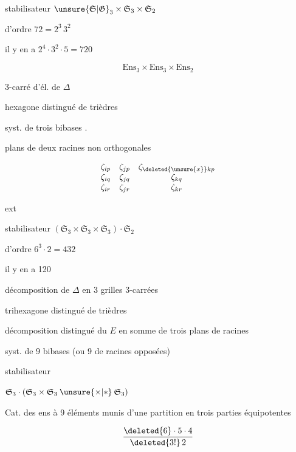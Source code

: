 stabilisateur $\unsure{\mathfrak S|\mathfrak G}_3\times\mathfrak S_3\times\mathfrak S_2$

d'ordre $72=2^3\,3^2$

il y en a $2^4\cdot3^2\cdot5=720$

\[
 \mathrm{Ens}_3\times\mathrm{Ens}_3\times\mathrm{Ens}_2
\]

 3-carré d'él. de $\Delta$

hexagone distingué de trièdres

syst. de trois bibases  .

plans de deux racines non orthogonales

\[
 \begin{matrix}
 \zeta_{ip}&\zeta_{jp}&\zeta_{\deleted{\unsure{x}}kp}\\
 \zeta_{iq}&\zeta_{jq}&\zeta_{kq}\\
 \zeta_{ir}&\zeta_{jr}&\zeta_{kr}
 \end{matrix}
\]

ext

stabilisateur $(\mathfrak S_3\times\mathfrak S_3\times\mathfrak S_3)\cdot\mathfrak S_2$

d'ordre $6^3\cdot2=432$

il y en a 120

décomposition de $\Delta$ en 3 grilles 3-carrées

trihexagone distingué de trièdres 

décomposition  distingué du $E$ en somme  de trois plans de racines

syst.  de 9 bibases (ou 9  de racines opposées)

stabilisateur

$\mathfrak S_3\cdot(\mathfrak S_3\times\mathfrak S_3\mathbin{\unsure{\times|*}}\mathfrak S_3)$

Cat. des ens à 9 éléments munis d'une partition en trois parties équipotentes

\[
 \frac{\deleted{6}\cdot5\cdot4}{\deleted{3!}\,2}
\]
